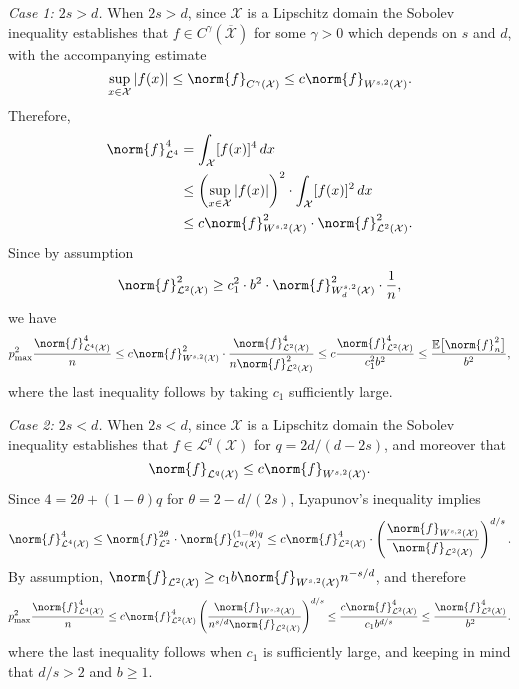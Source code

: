 \documentclass{article}
\newcommand{\abs}[1]{\left \lvert #1 \right \rvert}
\newcommand{\1}{\mathbf{1}}
\newcommand{\Xset}{\mathcal{X}}
\newcommand{\Leb}{\mathcal{L}}
\newcommand{\Ebb}{\mathbb{E}}
\theoremstyle{alden}
\theoremstyle{aldenthm}
\theoremstyle{definition}
\theoremstyle{remark}
\begin{document}
\textit{Case 1: $2s > d$.}
When $2s > d$, since $\Xset$ is a Lipschitz domain the Sobolev inequality establishes that $f \in C^{\gamma}(\overline{\Xset})$ for some $\gamma > 0$ which depends on $s$ and $d$, with the accompanying estimate
\begin{equation*}
\sup_{x \in \Xset} \abs{f(x)} \leq \norm{f}_{C^{\gamma}(\Xset)} \leq c \norm{f}_{W^{s,2}(\Xset)}.
\end{equation*}
Therefore,
\begin{align*}
\norm{f}_{\Leb^4}^4 & = \int_{\Xset} [f(x)]^4 \,dx \\
& \leq \left(\sup_{x \in \Xset} \abs{f(x)}\right)^2 \cdot \int_{\Xset} [f(x)]^2 \,dx \\
& \leq c \norm{f}_{W^{s,2}(\Xset)}^2 \cdot \norm{f}_{\Leb^2(\Xset)}^2.
\end{align*}
Since by assumption
\begin{equation*}
\norm{f}_{\Leb^2(\Xset)}^2 \geq c_1^2 \cdot b^2 \cdot \norm{f}_{W_d^{s,2}(\Xset)}^2 \cdot \frac{1}{n},
\end{equation*}
we have
\begin{equation*}
p_{\max}^2\frac{\norm{f}_{\Leb^4(\Xset)}^4}{n} \leq c \norm{f}_{W^{s,2}(\Xset)}^2 \cdot \frac{\norm{f}_{\Leb^2(\Xset)}^4}{n \norm{f}_{\Leb^2(\Xset)}^2} \leq c \frac{\norm{f}_{\Leb^2(\Xset)}^4}{c_1^2 b^2} \leq \frac{\Ebb\bigl[\norm{f}_n^2\bigr]}{b^2},
\end{equation*}
where the last inequality follows by taking $c_1$ sufficiently large.

\textit{Case 2: $2s < d$.}
When $2s < d$, since $\Xset$ is a Lipschitz domain the Sobolev inequality establishes that $f \in \Leb^q(\Xset)$ for $q = 2d/(d - 2s)$, and moreover that
\begin{equation*}
\norm{f}_{\Leb^q(\Xset)} \leq c \norm{f}_{W^{s,2}(\Xset)}.
\end{equation*}
Since $4 = 2\theta + (1 - \theta)q$ for $\theta = 2 - d/(2s)$, Lyapunov's inequality implies
\begin{equation*}
\norm{f}_{\Leb^4(\Xset)}^4 \leq \norm{f}_{\Leb^2}^{2\theta} \cdot \norm{f}_{\Leb^q(\Xset)}^{(1 - \theta)q} \leq c \norm{f}_{\Leb^2(\Xset)}^{4} \cdot \left(\frac{\norm{f}_{W^{s,2}(\Xset)}}{\norm{f}_{\Leb^2(\Xset)}}\right)^{d/s}.
\end{equation*}
By assumption, $\norm{f}_{\Leb^2(\Xset)} \geq c_1 b \norm{f}_{W^{s,2}(\Xset)} n^{-s/d}$, and therefore
\begin{equation*}
p_{\max}^2 \frac{\norm{f}_{\Leb^4(\Xset)}^4}{n} \leq c\norm{f}_{\Leb^2(\Xset)}^4 \left(\frac{\norm{f}_{W^{s,2}(\Xset)}}{n^{s/d}\norm{f}_{\Leb^2(\Xset)}}\right)^{d/s} \leq \frac{c\norm{f}_{\Leb^2(\Xset)}^4}{c_1b^{d/s}} \leq \frac{\norm{f}_{\Leb^2(\Xset)}^4}{b^2}.
\end{equation*}
where the last inequality follows when $c_1$ is sufficiently large, and keeping in mind that $d/s > 2$ and $b \geq 1$. 
\end{document}
